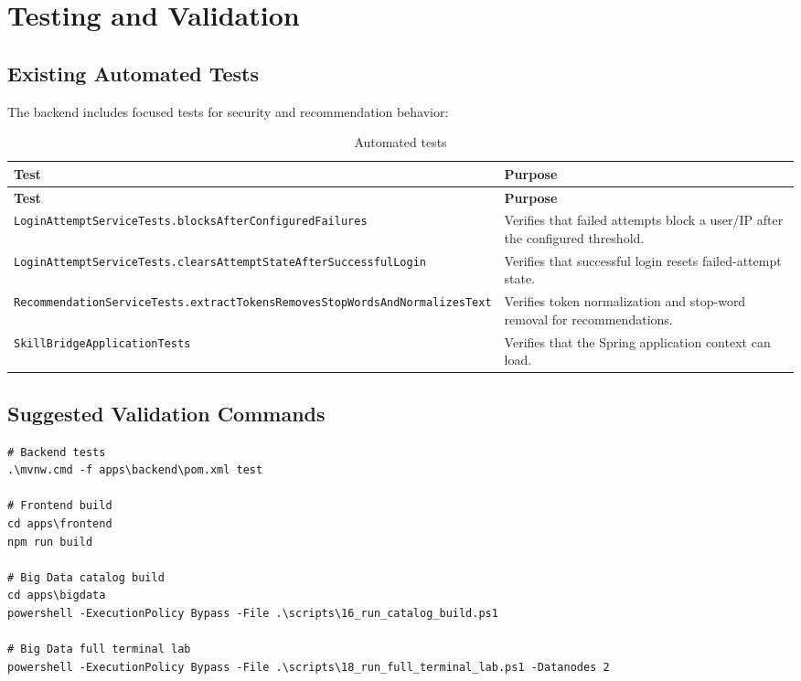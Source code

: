 \documentclass[12pt,a4paper]{report}
\begin{document}
\chapter{Testing and Validation}

\section{Existing Automated Tests}
The backend includes focused tests for security and recommendation behavior:

\begin{longtable}{p{}p{}}
\caption{Automated tests}\\
\toprule
\textbf{Test} & \textbf{Purpose}\\
\midrule
\endfirsthead
\toprule
\textbf{Test} & \textbf{Purpose}\\
\midrule
\endhead
\texttt{LoginAttemptServiceTests.blocksAfterConfiguredFailures} & Verifies that failed attempts block a user/IP after the configured threshold.\\
\texttt{LoginAttemptServiceTests.clearsAttemptStateAfterSuccessfulLogin} & Verifies that successful login resets failed-attempt state.\\
\texttt{RecommendationServiceTests.extractTokensRemovesStopWordsAndNormalizesText} & Verifies token normalization and stop-word removal for recommendations.\\
\texttt{SkillBridgeApplicationTests} & Verifies that the Spring application context can load.\\
\bottomrule
\end{longtable}

\section{Suggested Validation Commands}
\begin{lstlisting}
# Backend tests
.\mvnw.cmd -f apps\backend\pom.xml test

# Frontend build
cd apps\frontend
npm run build

# Big Data catalog build
cd apps\bigdata
powershell -ExecutionPolicy Bypass -File .\scripts\16_run_catalog_build.ps1

# Big Data full terminal lab
powershell -ExecutionPolicy Bypass -File .\scripts\18_run_full_terminal_lab.ps1 -Datanodes 2
\end{lstlisting}
\end{document}
